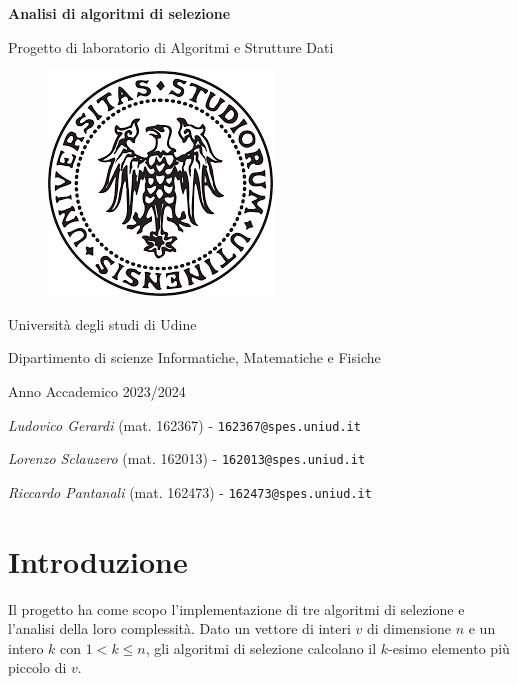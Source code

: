 \documentclass[a4paper,12pt]{article}
\begin{document}
\begin{titlepage} %
    \begin{center}
        \vspace*{1cm}
        {\Huge\bfseries Analisi di algoritmi di selezione\par}
        \vspace{.5cm}
        {\LARGE Progetto di laboratorio di Algoritmi e Strutture Dati\par}
        \vspace{1cm}
        \begin{figure}[h]
            \centering
            \includegraphics[width=.5\textwidth]{photo/uniud_logo.png}
        \end{figure}
        \vspace{1.5cm}
        {\LARGE Università degli studi di Udine\par}
        {\LARGE Dipartimento di scienze Informatiche, Matematiche e Fisiche\par}
        \vspace{.5cm}
        {\Large Anno Accademico 2023/2024\par}
        \vfill
	    {\Large \textit{Ludovico Gerardi} (mat. 162367) - \texttt{162367@spes.uniud.it} \par}
	    {\Large \textit{Lorenzo Sclauzero} (mat. 162013) - \texttt{162013@spes.uniud.it} \par}
	    {\Large \textit{Riccardo Pantanali} (mat. 162473) - \texttt{162473@spes.uniud.it} \par}
    \end{center}
\end{titlepage}



\section{Introduzione}
Il progetto ha come scopo l'implementazione di tre algoritmi di selezione e l'analisi della loro complessità.
Dato un vettore di interi $v$ di dimensione $n$ e un intero $k$ con $1 < k \le n$, gli algoritmi di selezione calcolano il $k$-esimo elemento più piccolo di $v$.
\end{document}
